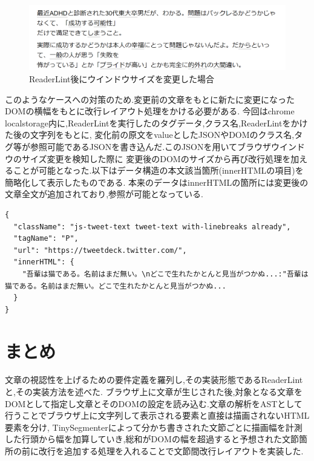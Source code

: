 \begin{figure}[H]
    \centering
    \label{fig:resize}
    \includegraphics[width=0.7\columnwidth]{image/03/img9.png}
	\caption[ReaderLint後にウインドウサイズを変更した場合]{ReaderLint後にウインドウサイズを変更した場合}
\end{figure}

このようなケースへの対策のため.変更前の文章をもとに新たに変更になったDOMの横幅をもとに改行レイアウト処理をかける必要がある.
今回はchrome localstorage内に,ReaderLintを実行したのタグデータ,クラス名,ReaderLintをかけた後の文字列をもとに,
変化前の原文をvalueとしたJSONやDOMのクラス名,タグ等が参照可能であるJSONを書き込んだ.このJSONを用いてブラウザウインドウのサイズ変更を検知した際に
変更後のDOMのサイズから再び改行処理を加えることが可能となった.以下はデータ構造の本文該当箇所(innerHTMLの項目)を簡略化して表示したものである.
本来のデータはinnerHTMLの箇所には変更後の文章全文が追加されており,参照が可能となっている.

\newpage

\begin{lstlisting}
{
  "className": "js-tweet-text tweet-text with-linebreaks already",
  "tagName": "P",
  "url": "https://tweetdeck.twitter.com/",
  "innerHTML": {
    "吾輩は猫である。名前はまだ無い。\nどこで生れたかとんと見当がつかぬ...:"吾輩は猫である。名前はまだ無い。どこで生れたかとんと見当がつかぬ...
  }
}
\end{lstlisting}

\section{まとめ}
文章の視認性を上げるための要件定義を羅列し,その実装形態であるReaderLintと,その実装方法を述べた.
ブラウザ上に文章が生じされた後,対象となる文章をDOMとして指定し文章とそのDOMの設定を読み込む.文章の解析をASTとして行うことでブラウザ上に文字列して表示される要素と直接は描画されないHTML要素を分け,
TinySegmenterによって分かち書きされた文節ごとに描画幅を計測した行頭から幅を加算していき,総和がDOMの幅を超過すると予想された文節箇所の前に改行を追加する処理を入れることで文節間改行レイアウトを実装した.
